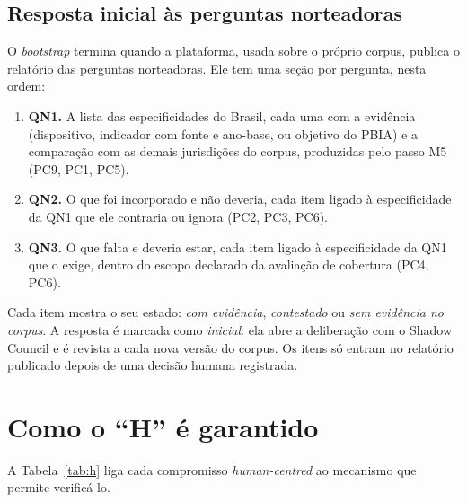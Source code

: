 \documentclass[12pt,a4paper,oneside,english,brazil]{abntex2}
\begin{document}
\section{Resposta inicial às perguntas norteadoras}\label{sec:bootstrap}
O \emph{bootstrap} termina quando a plataforma, usada sobre o próprio corpus, publica o relatório das perguntas norteadoras. Ele tem uma seção por pergunta, nesta ordem:
\begin{enumerate}[leftmargin=*]
  \item \textbf{QN1.} A lista das especificidades do Brasil, cada uma com a evidência (dispositivo, indicador com fonte e ano-base, ou objetivo do PBIA) e a comparação com as demais jurisdições do corpus, produzidas pelo passo M5 (PC9, PC1, PC5).
  \item \textbf{QN2.} O que foi incorporado e não deveria, cada item ligado à especificidade da QN1 que ele contraria ou ignora (PC2, PC3, PC6).
  \item \textbf{QN3.} O que falta e deveria estar, cada item ligado à especificidade da QN1 que o exige, dentro do escopo declarado da avaliação de cobertura (PC4, PC6).
\end{enumerate}
Cada item mostra o seu estado: \emph{com evidência}, \emph{contestado} ou \emph{sem evidência no corpus}. A resposta é marcada como \emph{inicial}: ela abre a deliberação com o Shadow Council e é revista a cada nova versão do corpus. Os itens só entram no relatório publicado depois de uma decisão humana registrada.

\chapter{Como o ``H'' é garantido}

A Tabela~\ref{tab:h} liga cada compromisso \emph{human-centred} ao mecanismo que permite verificá-lo.
\end{document}
